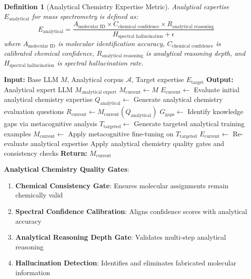 \documentclass[11pt,a4paper]{article}
\newtheorem{definition}[theorem]{Definition}
\theoremstyle{remark}
\begin{document}
\begin{definition}[Analytical Chemistry Expertise Metric]
Analytical expertise $E_{\text{analytical}}$ for mass spectrometry is defined as:
\begin{equation}
E_{\text{analytical}} = \frac{A_{\text{molecular ID}} \times C_{\text{chemical confidence}} \times R_{\text{analytical reasoning}}}{H_{\text{spectral hallucination}} + \epsilon}
\end{equation}
where $A_{\text{molecular ID}}$ is molecular identification accuracy, $C_{\text{chemical confidence}}$ is calibrated chemical confidence, $R_{\text{analytical reasoning}}$ is analytical reasoning depth, and $H_{\text{spectral hallucination}}$ is spectral hallucination rate.
\end{definition}

\begin{algorithm}[H]
\caption{Analytical Chemistry Expert Construction}
\begin{algorithmic}[1]
\State \textbf{Input:} Base LLM $M$, Analytical corpus $\mathcal{A}$, Target expertise $E_{\text{target}}$
\State \textbf{Output:} Analytical expert LLM $M_{\text{analytical expert}}$
\State $M_{\text{current}} \leftarrow M$
\State $E_{\text{current}} \leftarrow$ Evaluate initial analytical chemistry expertise
\State $Q_{\text{analytical}} \leftarrow$ Generate analytical chemistry evaluation questions
\State $R_{\text{current}} \leftarrow M_{\text{current}}(Q_{\text{analytical}})$
\State $G_{\text{gaps}} \leftarrow$ Identify knowledge gaps via metacognitive analysis
\State $T_{\text{targeted}} \leftarrow$ Generate targeted analytical training examples
\State $M_{\text{current}} \leftarrow$ Apply metacognitive fine-tuning on $T_{\text{targeted}}$
\State $E_{\text{current}} \leftarrow$ Re-evaluate analytical expertise
\State Apply analytical chemistry quality gates and consistency checks
\EndWhile
\State \textbf{Return:} $M_{\text{current}}$
\end{algorithmic}
\end{algorithm}

\textbf{Analytical Chemistry Quality Gates}:
\begin{enumerate}
\item \textbf{Chemical Consistency Gate}: Ensures molecular assignments remain chemically valid
\item \textbf{Spectral Confidence Calibration}: Aligns confidence scores with analytical accuracy
\item \textbf{Analytical Reasoning Depth Gate}: Validates multi-step analytical reasoning
\item \textbf{Hallucination Detection}: Identifies and eliminates fabricated molecular information
\end{enumerate}
\end{document}
